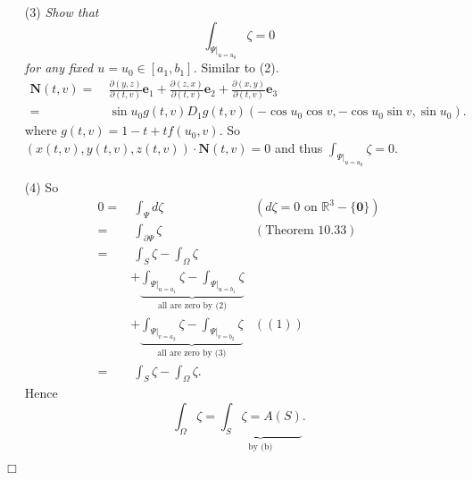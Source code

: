 \documentclass{article}
\begin{document}
\begin{enumerate}
\item[(3)]
  \emph{Show that
  \[
    \int_{\Psi|_{u=u_0}} \zeta = 0
  \]
  for any fixed $u = u_0 \in [a_1, b_1]$.}
  Similar to (2).
  \begin{align*}
    \mathbf{N}(t,v)
    =& \: \frac{\partial(y,z)}{\partial(t,v)} \mathbf{e}_1
      + \frac{\partial(z,x)}{\partial(t,v)} \mathbf{e}_2
      + \frac{\partial(x,y)}{\partial(t,v)}\mathbf{e}_3 \\
    =& \: \sin u_0 g(t,v) D_1 g(t,v)(-\cos u_0 \cos v, -\cos u_0 \sin v, \sin u_0).
  \end{align*}
  where $g(t,v) = 1-t+tf(u_0,v)$.
  So $(x(t,v),y(t,v),z(t,v)) \cdot \mathbf{N}(t,v) = 0$ and thus
  $\int_{\Psi|_{u=u_0}} \zeta = 0$.

\item[(4)]
  So
  \begin{align*}
    0
    =& \: \int_{\Psi} d\zeta
      &(\text{$d\zeta = 0$ on $\mathbb{R}^3-\{\mathbf{0}\}$}) \\
    =& \: \int_{\partial \Psi} \zeta
      &(\text{Theorem 10.33}) \\
    =& \: \int_{S} \zeta - \int_{\Omega} \zeta \\
      &+ \underbrace{\int_{\Psi|_{u=a_1}} \zeta - \int_{\Psi|_{u=b_1}} \zeta}_{
        \text{all are zero by (2)}} \\
      &+ \underbrace{\int_{\Psi|_{v=a_2}} \zeta - \int_{\Psi|_{v=b_2}} \zeta}_{
        \text{all are zero by (3)}}
        &((1)) \\
    =& \: \int_{S} \zeta - \int_{\Omega} \zeta.
  \end{align*}
  Hence
  \[
    \int_{\Omega} \zeta = \underbrace{\int_{S} \zeta = A(S)}_{\text{by (b)}}.
  \]
\end{enumerate}
$\Box$ \\
\end{document}
